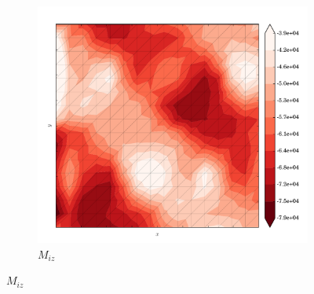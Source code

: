 \begin{figure}
  \begin{subfigure}[b]{0.3\linewidth}
    \includegraphics[width=\linewidth]{images/stress_balance/RS/M_iz.pdf}
  \caption{$M_{iz}$}
  \label{rs_M_iz}
  \end{subfigure}


\end{figure}
